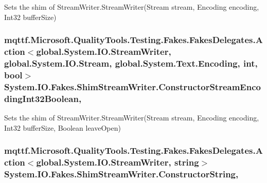 Sets the shim of Stream\-Writer.\-Stream\-Writer(\-Stream stream, Encoding encoding, Int32 buffer\-Size)

\hypertarget{class_system_1_1_i_o_1_1_fakes_1_1_shim_stream_writer_a17c1cdaaa0ab084e19cbb7105521d702}{
\subsubsection[{Constructor\-Stream\-Encoding\-Int32\-Boolean}]{\setlength{\rightskip}{0pt plus 5cm}mqttf.\-Microsoft.\-Quality\-Tools.\-Testing.\-Fakes.\-Fakes\-Delegates.\-Action$<$global.\-System.\-I\-O.\-Stream\-Writer, global.\-System.\-I\-O.\-Stream, global.\-System.\-Text.\-Encoding, int, bool$>$ System.\-I\-O.\-Fakes.\-Shim\-Stream\-Writer.\-Constructor\-Stream\-Encoding\-Int32\-Boolean\hspace{0.3cm}{\ttfamily [static]}, {\ttfamily [set]}}}\label{class_system_1_1_i_o_1_1_fakes_1_1_shim_stream_writer_a17c1cdaaa0ab084e19cbb7105521d702}


Sets the shim of Stream\-Writer.\-Stream\-Writer(\-Stream stream, Encoding encoding, Int32 buffer\-Size, Boolean leave\-Open)

\hypertarget{class_system_1_1_i_o_1_1_fakes_1_1_shim_stream_writer_a26ba1d93e857cfa90652958ac9542d05}{
\subsubsection[{Constructor\-String}]{\setlength{\rightskip}{0pt plus 5cm}mqttf.\-Microsoft.\-Quality\-Tools.\-Testing.\-Fakes.\-Fakes\-Delegates.\-Action$<$global.\-System.\-I\-O.\-Stream\-Writer, string$>$ System.\-I\-O.\-Fakes.\-Shim\-Stream\-Writer.\-Constructor\-String\hspace{0.3cm}{\ttfamily [static]}, {\ttfamily [set]}}}\label{class_system_1_1_i_o_1_1_fakes_1_1_shim_stream_writer_a26ba1d93e857cfa90652958ac9542d05}


